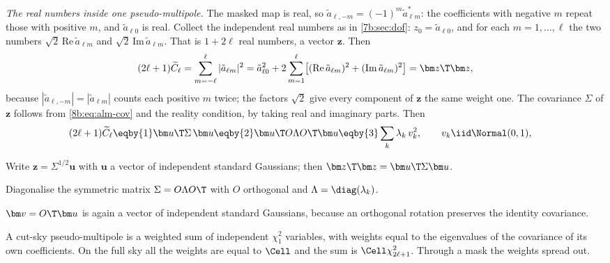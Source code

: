 \emph{The real numbers inside one pseudo-multipole.} The masked map is real, so $\tilde a_{\ell,-m}=(-1)^m\tilde a^*_{\ell m}$:
the coefficients with negative $m$ repeat those with positive $m$, and $\tilde a_{\ell0}$ is real. Collect
the independent real numbers as in \cref{7b:sec:dof}: $z_0=\tilde a_{\ell0}$, and for each $m=1,\dots,\ell$ the two
numbers $\sqrt2\,\mathrm{Re}\,\tilde a_{\ell m}$ and $\sqrt2\,\mathrm{Im}\,\tilde a_{\ell m}$. That is $1+2\ell$ real numbers, a vector $\bm z$.
Then
\[
  (2\ell+1)\widetilde C_\ell=\sum_{m=-\ell}^{\ell}|\tilde a_{\ell m}|^2=\tilde a_{\ell0}^2+2\sum_{m=1}^{\ell}\bigl[(\mathrm{Re}\,\tilde a_{\ell m})^2+(\mathrm{Im}\,\tilde a_{\ell m})^2\bigr]
  =\bm z\T\bm z ,
\]
because $|\tilde a_{\ell,-m}|=|\tilde a_{\ell m}|$ counts each positive $m$ twice; the factors $\sqrt2$ give every
component of $\bm z$ the same weight one. The covariance $\Sigma$ of $\bm z$ follows from \eqref{8b:eq:alm-cov}
and the reality condition, by taking real and imaginary parts. Then
\begin{align}
  (2\ell+1)\widetilde C_\ell
  &\eqby{1}\bm u\T\Sigma\,\bm u
   \eqby{2}\bm u\T O\Lambda O\T\bm u
   \eqby{3}\sum_k\lambda_k\,v_k^2,
  \qquad v_k\iid\Normal(0,1),
  \label{8b:eq:quadform}
\end{align}
\begin{explain}
  \item Write $\bm z=\Sigma^{1/2}\bm u$ with $\bm u$ a vector of independent standard Gaussians; then
        $\bm z\T\bm z=\bm u\T\Sigma\bm u$.
  \item Diagonalise the symmetric matrix $\Sigma=O\Lambda O\T$ with $O$ orthogonal and
        $\Lambda=\diag(\lambda_k)$.
  \item $\bm v=O\T\bm u$ is again a vector of independent standard Gaussians, because an orthogonal
        rotation preserves the identity covariance.
\end{explain}
A cut-sky pseudo-multipole is a weighted sum of independent $\chi^2_1$ variables, with weights equal
to the eigenvalues of the covariance of its own coefficients. On the full sky all the weights are
equal to $\Cell$ and the sum is $\Cell\chi^2_{2\ell+1}$. Through a mask the weights spread out.

